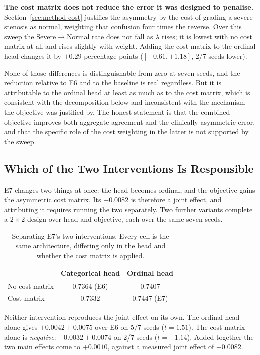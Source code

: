 \documentclass[12pt,a4paper]{report}
\begin{document}
\textbf{The cost matrix does not reduce the error it was designed to penalise.}
Section~\ref{sec:method-cost} justifies the asymmetry by the cost of grading a
severe stenosis as normal, weighting that confusion four times the reverse. Over
this sweep the Severe$\rightarrow$Normal rate does not fall as $\lambda$ rises;
it is lowest with no cost matrix at all and rises slightly with weight. Adding
the cost matrix to the ordinal head changes it by $+0.29$ percentage points
($[-0.61, +1.18]$, 2/7 seeds lower).

None of those differences is distinguishable from zero at seven seeds, and the
reduction relative to E6 and to the baseline is real regardless. But it is
attributable to the ordinal head at least as much as to the cost matrix, which
is consistent with the decomposition below and inconsistent with the mechanism
the objective was justified by. The honest statement is that the combined
objective improves both aggregate agreement and the clinically asymmetric error,
and that the specific role of the cost weighting in the latter is not supported
by the sweep.

\subsection{Which of the Two Interventions Is Responsible}
\label{sec:results-rq5-decomp}

E7 changes two things at once: the head becomes ordinal, and the objective gains
the asymmetric cost matrix. Its $+0.0082$ is therefore a joint effect, and
attributing it requires running the two separately. Two further variants complete
a $2 \times 2$ design over head and objective, each over the same seven seeds.

\begin{table}[htbp]
  \centering
  \caption{Separating E7's two interventions. Every cell is the same
  architecture, differing only in the head and whether the cost matrix is
  applied.}
  \label{tab:e7decomp}
  \begin{tabular}{lcc}
    \toprule
     & Categorical head & Ordinal head \\
    \midrule
    No cost matrix & $0.7364$ (E6) & $0.7407$ \\
    Cost matrix    & $0.7332$      & $\mathbf{0.7447}$ (E7) \\
    \bottomrule
  \end{tabular}
\end{table}

Neither intervention reproduces the joint effect on its own. The ordinal head
alone gives $+0.0042 \pm 0.0075$ over E6 on 5/7 seeds ($t = 1.51$). The cost
matrix alone is \emph{negative}: $-0.0032 \pm 0.0074$ on 2/7 seeds
($t = -1.14$). Added together the two main effects come to $+0.0010$, against a
measured joint effect of $+0.0082$.
\end{document}
